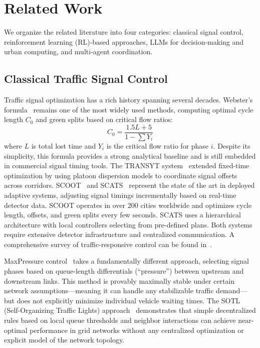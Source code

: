 \documentclass[conference]{IEEEtran}
\begin{document}
\section{Related Work}
\label{sec:related}

We organize the related literature into four categories: classical signal control, reinforcement learning (RL)-based approaches, LLMs for decision-making and urban computing, and multi-agent coordination.

\subsection{Classical Traffic Signal Control}
Traffic signal optimization has a rich history spanning several decades. Webster's formula~\cite{webster1958} remains one of the most widely used methods, computing optimal cycle length $C_0$ and green splits based on critical flow ratios:
\begin{equation}
    C_0 = \frac{1.5L + 5}{1 - \sum Y_i}
    \label{eq:webster}
\end{equation}
where $L$ is total lost time and $Y_i$ is the critical flow ratio for phase $i$. Despite its simplicity, this formula provides a strong analytical baseline and is still embedded in commercial signal timing tools. The TRANSYT system~\cite{robertson1969transyt} extended fixed-time optimization by using platoon dispersion models to coordinate signal offsets across corridors. SCOOT~\cite{hunt1981} and SCATS~\cite{lowrie1990} represent the state of the art in deployed adaptive systems, adjusting signal timings incrementally based on real-time detector data. SCOOT operates in over 200 cities worldwide and optimizes cycle length, offsets, and green splits every few seconds. SCATS uses a hierarchical architecture with local controllers selecting from pre-defined plans. Both systems require extensive detector infrastructure and centralized communication. A comprehensive survey of traffic-responsive control can be found in~\cite{papageorgiou2003review}.

MaxPressure control~\cite{varaiya2013} takes a fundamentally different approach, selecting signal phases based on queue-length differentials (``pressure'') between upstream and downstream links. This method is provably maximally stable under certain network assumptions---meaning it can handle any stabilizable traffic demand---but does not explicitly minimize individual vehicle waiting times. The SOTL (Self-Organizing Traffic Lights) approach~\cite{gershenson2005} demonstrates that simple decentralized rules based on local queue thresholds and neighbor interactions can achieve near-optimal performance in grid networks without any centralized optimization or explicit model of the network topology.
\end{document}

